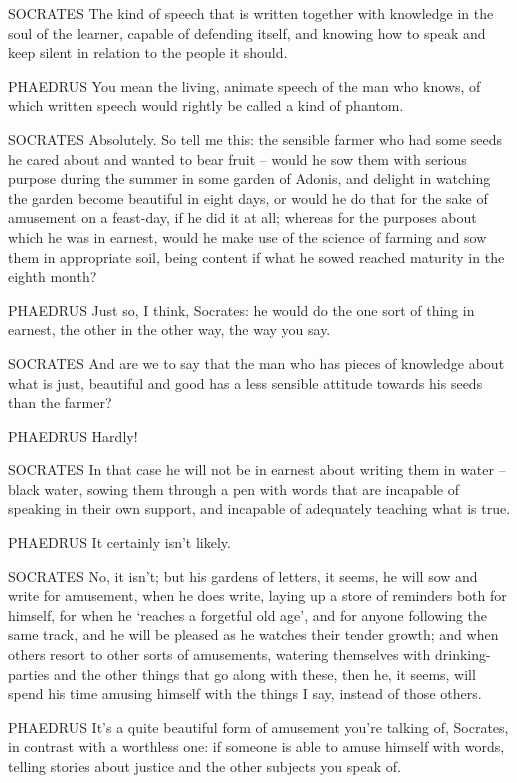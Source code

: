 SOCRATES The kind of speech that is written together with 
knowledge in the soul of the learner, capable of defending itself, and
knowing how to speak and keep silent in relation to the people it
should.

PHAEDRUS You mean the living,
animate speech of the
man who knows, of which written speech would rightly be called a kind of
phantom.

 SOCRATES Absolutely. So tell me this: the sensible farmer who
had some seeds he cared about and wanted to bear fruit -- would he sow
them with serious purpose during the summer in some garden of
Adonis, and delight in
watching the garden become  beautiful in eight days, or would he
do that for the sake of amusement on a feast-day, if he did it at all;
whereas for the purposes about which he was in earnest, would he make
use of the science of farming and sow them in appropriate soil, being
content if what he sowed reached maturity in the eighth month?

 PHAEDRUS Just so, I think, Socrates: he would do the one sort
of thing in earnest, the other in the other way, the way you say.

SOCRATES And are we to say that the man who has pieces of
knowledge about what is
just, beautiful and good
has a  less sensible attitude towards his seeds than the farmer?

PHAEDRUS Hardly!

SOCRATES In that case he will not be in earnest about writing them in
water -- black water, sowing them through a pen with words that are
incapable of speaking in their own support, and incapable of adequately
teaching what is true.

 PHAEDRUS It certainly isn't likely.

 SOCRATES No, it isn't; but his gardens of letters, it seems, he
will sow and write for amusement, when he does write, laying up a store
of reminders both for himself, for when he ‘reaches a forgetful old
age', and for anyone
following the same track,  and he will be pleased as he watches
their tender growth; and when others resort to other sorts of
amusements, watering themselves with drinking-parties and the other
things that go along with these, then he, it seems, will spend his time
amusing himself with the things I say, instead of those others.

 PHAEDRUS It's a quite beautiful form of amusement you're
talking of, Socrates, in contrast with a worthless one: if someone is
able to amuse himself with words, telling stories about justice and the
other subjects you speak
of.

